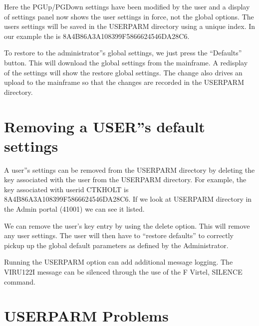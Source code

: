 \documentclass[letterpaper,10pt,english]{sphinxmanual}
\begin{document}
Here the PGUp/PGDown settings have been modified by the user and a display of settings panel now shows the user settings in force, not the global options. The users settings will be saved in the USERPARM directory using a unique index. In our example the is 8A4B86A3A108399F5866624546DA28C6.



To restore to the administrator”s global settings, we just press the “Defaults” button. This will download the global settings from the mainframe. A redisplay of the settings will show the restore global settings. The change also drives an upload to the mainframe so that the changes are recorded in the USERPARM directory.




\section{Removing a USER”s default settings}
\label{\detokenize{TN202002:removing-a-user-s-default-settings}}
A user”s settings can be removed from the USERPARM directory by deleting the key associated with the user from the USERPARM directory. For example, the key associated with userid CTKHOLT is 8A4B86A3A108399F5866624546DA28C6. If we look at USERPARM directory in the Admin portal (41001) we can see it listed.


We can remove the user’s key entry by using the delete option. This will remove any user settings. The user will then have to “restore defaults” to correctly pickup up the global default parameters as defined by the Administrator.


Running the USERPARM option can add additional message logging. The VIRU122I message can be silenced through the use of the F Virtel, SILENCE command.

\newpage


\section{USERPARM Problems}
\label{\detokenize{TN202002:userparm-problems}}
\end{document}
